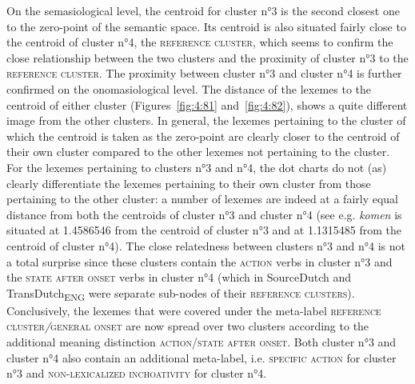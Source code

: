 On the semasiological level, the centroid for cluster n°3 is the second closest one to the zero-point of the semantic space. Its centroid is also situated fairly close to the centroid of cluster n°4, the \textsc{reference cluster}, which seems to confirm the close relationship between the two clusters and the proximity of cluster n°3 to the \textsc{reference cluster}. The proximity between cluster n°3 and cluster n°4 is further confirmed on the onomasiological level. The distance of the lexemes to the centroid of either cluster (Figures~\ref{fig:4:81} and~\ref{fig:4:82}), shows a quite different image from the other clusters. In general, the lexemes pertaining to the cluster of which the centroid is taken as the zero-point are clearly closer to the centroid of their own cluster compared to the other lexemes not pertaining to the cluster. For the lexemes pertaining to clusters n°3 and n°4, the dot charts do not (as) clearly differentiate the lexemes pertaining to their own cluster from those pertaining to the other cluster: a number of lexemes are indeed at a fairly equal distance from both the centroids of cluster n°3 and cluster n°4 (see e.g. \textit{komen} is situated at 1.4586546 from the centroid of cluster n°3 and at 1.1315485 from the centroid of cluster n°4). The close relatedness between clusters n°3 and n°4 is not a total surprise since these clusters contain the \textsc{action} verbs in cluster n°3 and the \textsc{state after onset} verbs in cluster n°4 (which in SourceDutch and TransDutch\textsubscript{ENG} were separate sub-nodes of their \textsc{reference clusters}). Conclusively, the lexemes that were covered under the meta-label \textsc{reference cluster}\textit{/}\textsc{general onset} are now spread over two clusters according to the additional meaning distinction \textsc{action}\slash \textsc{state after onset}. Both cluster n°3 and cluster n°4 also contain an additional meta-label, i.e. {\textsc{specific}} \textsc{action} for cluster n°3 and {\textsc{non-lexicalized inchoativity}} for cluster n°4.

